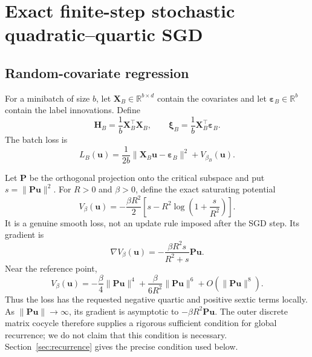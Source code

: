 \documentclass[11pt]{article}
\theoremstyle{definition}
\newcommand{\R}{\mathbb R}
\newcommand{\uvec}{\mathbf u}
\newcommand{\Hvec}{\mathbf H}
\newcommand{\Pvec}{\mathbf P}
\newcommand{\xivec}{\boldsymbol\xi}
\begin{document}
\section{Exact finite-step stochastic quadratic--quartic SGD}
\label{sec:model}

\subsection{Random-covariate regression}

For a minibatch of size $b$, let
$\mathbf X_B\in\R^{b\times d}$ contain the covariates and let
$\boldsymbol\varepsilon_B\in\R^b$ contain the label innovations.  Define
\begin{equation}
  \Hvec_B=\frac1b\mathbf X_B^\top\mathbf X_B,
  \qquad
  \xivec_B=\frac1b\mathbf X_B^\top\boldsymbol\varepsilon_B.
  \label{eq:hessian-noise}
\end{equation}
The batch loss is
\begin{equation}
  L_B(\uvec)
  =\frac1{2b}\|\mathbf X_B\uvec-\boldsymbol\varepsilon_B\|^2
   +V_{\beta_B}(\uvec).
  \label{eq:batch-loss}
\end{equation}

Let $\Pvec$ be the orthogonal projection onto the critical subspace and put
$s=\|\Pvec\uvec\|^2$.  For $R>0$ and $\beta>0$, define the exact saturating
potential
\begin{equation}
  V_\beta(\uvec)
  =-\frac{\beta R^2}{2}
      \left[s-R^2\log\!\left(1+\frac{s}{R^2}\right)\right].
  \label{eq:saturating-potential}
\end{equation}
It is a genuine smooth loss, not an update rule imposed after the SGD step.
Its gradient is
\begin{equation}
 \nabla V_\beta(\uvec)
 =-\frac{\beta R^2s}{R^2+s}\Pvec\uvec.
 \label{eq:saturating-gradient}
\end{equation}
Near the reference point,
\begin{equation}
  V_\beta(\uvec)
  =-\frac\beta4\|\Pvec\uvec\|^4
   +\frac{\beta}{6R^2}\|\Pvec\uvec\|^6
   +O(\|\Pvec\uvec\|^8).
  \label{eq:local-expansion}
\end{equation}
Thus the loss has the requested negative quartic and positive sextic terms
locally.  As $\|\Pvec\uvec\|\to\infty$, its gradient is asymptotic to
$-\beta R^2\Pvec\uvec$.  The outer discrete matrix cocycle therefore supplies
a rigorous sufficient condition for global recurrence; we do not claim that
this condition is necessary.  Section~\ref{sec:recurrence} gives the precise
condition used below.
\end{document}
